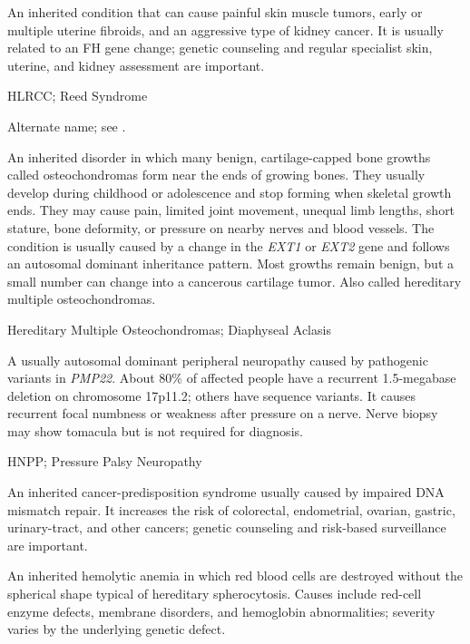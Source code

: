  An inherited condition that can cause painful skin muscle tumors, early or multiple uterine fibroids, and an aggressive type of kidney cancer. It is usually related to an FH gene change; genetic counseling and regular specialist skin, uterine, and kidney assessment are important.

\synonyms
HLRCC; Reed Syndrome

 Alternate name; see .

 An inherited disorder in which many benign, cartilage-capped bone growths called osteochondromas form near the ends of growing bones. They usually develop during childhood or adolescence and stop forming when skeletal growth ends. They may cause pain, limited joint movement, unequal limb lengths, short stature, bone deformity, or pressure on nearby nerves and blood vessels. The condition is usually caused by a change in the \textit{EXT1} or \textit{EXT2} gene and follows an autosomal dominant inheritance pattern. Most growths remain benign, but a small number can change into a cancerous cartilage tumor. Also called hereditary multiple osteochondromas.

\synonyms
Hereditary Multiple Osteochondromas; Diaphyseal Aclasis

 A usually autosomal dominant peripheral neuropathy caused by pathogenic variants in \textit{PMP22}. About 80\% of affected people have a recurrent 1.5-megabase deletion on chromosome 17p11.2; others have sequence variants. It causes recurrent focal numbness or weakness after pressure on a nerve. Nerve biopsy may show tomacula but is not required for diagnosis.

\synonyms
HNPP; Pressure Palsy Neuropathy

 An inherited cancer-predisposition syndrome usually caused by impaired DNA mismatch repair. It increases the risk of colorectal, endometrial, ovarian, gastric, urinary-tract, and other cancers; genetic counseling and risk-based surveillance are important.

 An inherited hemolytic anemia in which red blood cells are destroyed without the spherical shape typical of hereditary spherocytosis. Causes include red-cell enzyme defects, membrane disorders, and hemoglobin abnormalities; severity varies by the underlying genetic defect.

